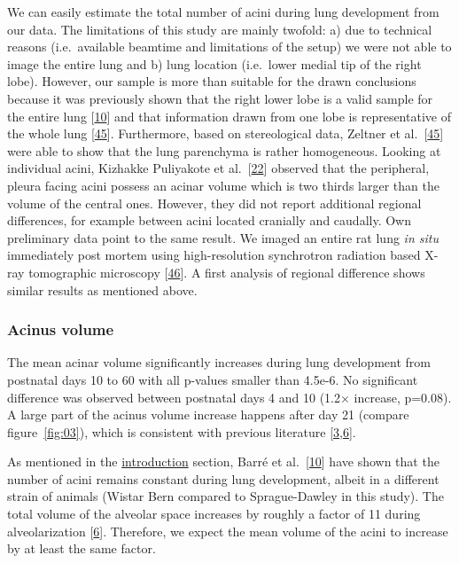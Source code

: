 \documentclass[
  american,
]{article}
\begin{document}
We can easily estimate the total number of acini during lung development from our data.
The limitations of this study are mainly twofold: a) due to technical reasons (i.e.~available beamtime and limitations of the setup) we were not able to image the entire lung and b) lung location (i.e.~lower medial tip of the right lobe).
However, our sample is more than suitable for the drawn conclusions because it was previously shown that the right lower lobe is a valid sample for the entire lung {[}\protect\hyperlink{ref-14OP85b2F}{10}{]} and that information drawn from one lobe is representative of the whole lung {[}\protect\hyperlink{ref-I9TmP6IU}{45}{]}.
Furthermore, based on stereological data, Zeltner et al.~{[}\protect\hyperlink{ref-I9TmP6IU}{45}{]} were able to show that the lung parenchyma is rather homogeneous.
Looking at individual acini, Kizhakke Puliyakote et al.~{[}\protect\hyperlink{ref-RGBeCf8v}{22}{]} observed that the peripheral, pleura facing acini possess an acinar volume which is two thirds larger than the volume of the central ones.
However, they did not report additional regional differences, for example between acini located cranially and caudally.
Own preliminary data point to the same result.
We imaged an entire rat lung \emph{in situ} immediately post mortem using high-resolution synchrotron radiation based X-ray tomographic microscopy {[}\protect\hyperlink{ref-Zv1XcgAO}{46}{]}.
A first analysis of regional difference shows similar results as mentioned above.

\hypertarget{acinus-volume-1}{%
\subsubsection{Acinus volume}\label{acinus-volume-1}}

The mean acinar volume significantly increases during lung development from postnatal days 10 to 60 with all p-values smaller than 4.5e-6.
No significant difference was observed between postnatal days 4 and 10 (1.2× increase, p=0.08).
A large part of the acinus volume increase happens after day 21 (compare figure~\ref{fig:03}), which is consistent with previous literature {[}\protect\hyperlink{ref-auNiE56G}{3},\protect\hyperlink{ref-wnl86DEM}{6}{]}.

As mentioned in the \protect\hyperlink{introduction}{introduction} section, Barré et al.~{[}\protect\hyperlink{ref-14OP85b2F}{10}{]} have shown that the number of acini remains constant during lung development, albeit in a different strain of animals (Wistar Bern compared to Sprague-Dawley in this study).
The total volume of the alveolar space increases by roughly a factor of 11 during alveolarization {[}\protect\hyperlink{ref-wnl86DEM}{6}{]}.
Therefore, we expect the mean volume of the acini to increase by at least the same factor.
\end{document}
